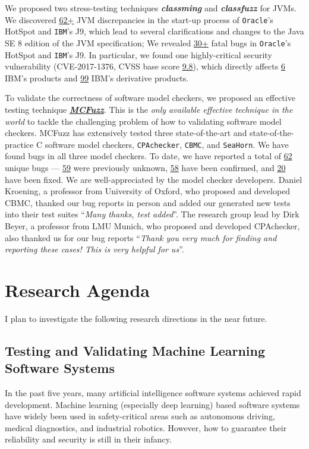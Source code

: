 \documentclass[a4paper]{article}
\begin{document}
We proposed two stress-testing techniques \emph{\textbf{classming}} and \emph{\textbf{classfuzz}} for JVMs. We discovered \underline{62+} JVM discrepancies in the start-up process of \texttt{Oracle}'s HotSpot and \texttt{IBM}'s J9, which lead to  several clarifications and changes to the Java SE 8 edition of the JVM specification; We revealed \underline{30+} fatal bugs in \texttt{Oracle}'s HotSpot and \texttt{IBM}'s J9. In particular, we found one highly-critical security vulnerability (CVE-2017-1376, CVSS base score \underline{9.8}), which directly affects \underline{6} IBM's products and \underline{99} IBM's derivative products.

To validate the correctness of software model checkers, we proposed an effective testing technique \textbf{\emph{\href{https://github.com/MCFuzzer/MCFuzz}{MCFuzz}}}. 
This is the \emph{only available effective technique in the world} to tackle the challenging problem of how to validating software model checkers.
MCFuzz has extensively tested three state-of-the-art and state-of-the-practice C software model checkers, \texttt{CPAchecker}, \texttt{CBMC}, and \texttt{SeaHorn}. We have found bugs in all
three model checkers. To date, we have reported a total of \underline{62} unique bugs --- \underline{59} were previously unknown, \underline{58} have been confirmed, and \underline{20} have been fixed. We are well-appreciated by the model checker developers.
Daniel Kroening, a professor from University of Oxford, who proposed and developed CBMC, thanked our bug reports in person and added our generated new tests into their test suites ``\emph{Many thanks, test added}''.
The research group lead by Dirk Beyer, a professor from LMU Munich, who proposed and developed CPAchecker, also thanked us for our bug reports ``\emph{Thank you very much for finding and reporting these cases! This is very helpful for us}''.

\section{Research Agenda}

I plan to investigate the following research directions in the near future.

\subsection{Testing and Validating Machine Learning Software Systems}

In the past five years, many artificial intelligence software systems achieved rapid development. Machine learning (especially deep learning) based software systems have widely been used in safety-critical areas such as autonomous driving, medical diagnostics, and industrial robotics. However, how to guarantee their reliability and security is still in their infancy. 
\end{document}

